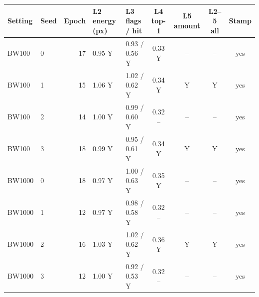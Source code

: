 \begin{tabular}{llrllcccc}
\toprule
Setting & Seed & Epoch & L2 energy (px) & L3 flags / hit & L4 top-1 & L5 amount & L2--5 all & Stamp \\
\midrule
BW100 & 0 & 17 & 0.95 Y & 0.93 / 0.56 Y & 0.33 Y & -- & -- & yes \\
BW100 & 1 & 15 & 1.06 Y & 1.02 / 0.62 Y & 0.34 Y & Y & Y & yes \\
BW100 & 2 & 14 & 1.00 Y & 0.99 / 0.60 Y & 0.32 -- & -- & -- & yes \\
BW100 & 3 & 18 & 0.99 Y & 0.95 / 0.61 Y & 0.34 Y & Y & Y & yes \\
\midrule
BW1000 & 0 & 18 & 0.97 Y & 1.00 / 0.63 Y & 0.35 Y & -- & -- & yes \\
BW1000 & 1 & 12 & 0.97 Y & 0.98 / 0.58 Y & 0.32 -- & -- & -- & yes \\
BW1000 & 2 & 16 & 1.03 Y & 1.02 / 0.62 Y & 0.36 Y & Y & Y & yes \\
BW1000 & 3 & 12 & 1.00 Y & 0.92 / 0.53 Y & 0.32 -- & -- & -- & yes \\
\bottomrule
\end{tabular}
